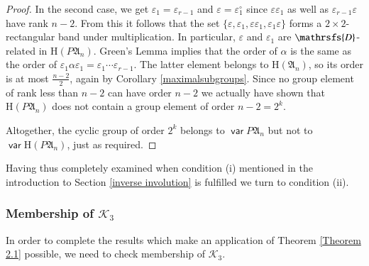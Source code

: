 \documentclass[preprint,1p,times]{elsarticle}
\DeclareMathOperator{\var}{\mathsf{var}}
\numberwithin{equation}{section}
\theoremstyle{remark}
\def\Dc{\mathrsfs{D}}
\def\ep{\varepsilon}
\def\H{\mathrm H}
\def\A{\mathfrak{A}}
\begin{document}
\begin{proof}
In the second case, we get $\ep_1=\ep_{r-1}$ and $\ep=\ep_1^\circ$ since $\ep\ep_1$ as well as $\ep_{r-1}\ep$ have
rank $n-2$. From this it follows that the set $\{\ep,\ep_1,\ep\ep_1,\ep_1\ep\}$ forms a $2\times 2$-rectangular band
under multiplication. In particular, $\ep$ and $\ep_1$ are $\Dc$-related in $\H (P\A_n)$. Green's Lemma implies that
the order of $\alpha$ is the same as the order of $\ep_1\alpha\ep_1=\ep_1\cdots\ep_{r-1}$. The latter element belongs
to $\H(\A_n)$, so its order is at most $\frac{n-2}2$, again by Corollary \ref{maximalsubgroups}. Since no group element
of rank less than $n-2$ can have order $n-2$ we actually have shown that $\H (P\A_n)$ does not contain a group element
of order $n-2=2^k$.

Altogether, the cyclic group of order $2^k$ belongs to $\var P\A_n$ but not to $\var\H (P\A_n)$, just as required.
\end{proof}
Having thus completely examined when condition (i) mentioned in the introduction to Section \ref{inverse involution} is
fulfilled we turn to condition (ii).

\subsubsection{Membership of $\mathcal{K}_3$}

In order to complete the results which make an application of Theorem \ref{Theorem 2.1} possible, we need to check
membership of $\mathcal{K}_3$.
\end{document}
